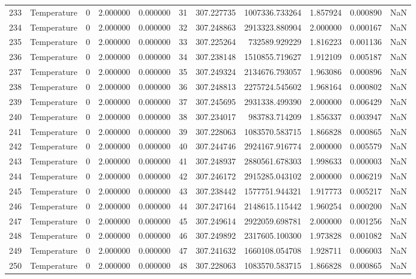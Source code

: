 \begin{tabular}{llrrrrrrrrr}
233 & Temperature & 0 & 2.000000 & 0.000000 & 31 & 307.227735 & 1007336.733264 & 1.857924 & 0.000890 & NaN \\
234 & Temperature & 0 & 2.000000 & 0.000000 & 32 & 307.248863 & 2913323.880904 & 2.000000 & 0.000167 & NaN \\
235 & Temperature & 0 & 2.000000 & 0.000000 & 33 & 307.225264 & 732589.929229 & 1.816223 & 0.001136 & NaN \\
236 & Temperature & 0 & 2.000000 & 0.000000 & 34 & 307.238148 & 1510855.719627 & 1.912109 & 0.005187 & NaN \\
237 & Temperature & 0 & 2.000000 & 0.000000 & 35 & 307.249324 & 2134676.793057 & 1.963086 & 0.000896 & NaN \\
238 & Temperature & 0 & 2.000000 & 0.000000 & 36 & 307.248813 & 2275724.545602 & 1.968164 & 0.000802 & NaN \\
239 & Temperature & 0 & 2.000000 & 0.000000 & 37 & 307.245695 & 2931338.499390 & 2.000000 & 0.006429 & NaN \\
240 & Temperature & 0 & 2.000000 & 0.000000 & 38 & 307.234017 & 983783.714209 & 1.856337 & 0.003947 & NaN \\
241 & Temperature & 0 & 2.000000 & 0.000000 & 39 & 307.228063 & 1083570.583715 & 1.866828 & 0.000865 & NaN \\
242 & Temperature & 0 & 2.000000 & 0.000000 & 40 & 307.244746 & 2924167.916774 & 2.000000 & 0.005579 & NaN \\
243 & Temperature & 0 & 2.000000 & 0.000000 & 41 & 307.248937 & 2880561.678303 & 1.998633 & 0.000003 & NaN \\
244 & Temperature & 0 & 2.000000 & 0.000000 & 42 & 307.246172 & 2915285.043102 & 2.000000 & 0.006219 & NaN \\
245 & Temperature & 0 & 2.000000 & 0.000000 & 43 & 307.238442 & 1577751.944321 & 1.917773 & 0.005217 & NaN \\
246 & Temperature & 0 & 2.000000 & 0.000000 & 44 & 307.247164 & 2148615.115442 & 1.960254 & 0.000200 & NaN \\
247 & Temperature & 0 & 2.000000 & 0.000000 & 45 & 307.249614 & 2922059.698781 & 2.000000 & 0.001256 & NaN \\
248 & Temperature & 0 & 2.000000 & 0.000000 & 46 & 307.249892 & 2317605.100300 & 1.973828 & 0.001082 & NaN \\
249 & Temperature & 0 & 2.000000 & 0.000000 & 47 & 307.241632 & 1660108.054708 & 1.928711 & 0.006003 & NaN \\
250 & Temperature & 0 & 2.000000 & 0.000000 & 48 & 307.228063 & 1083570.583715 & 1.866828 & 0.000865 & NaN \\

\end{tabular}
